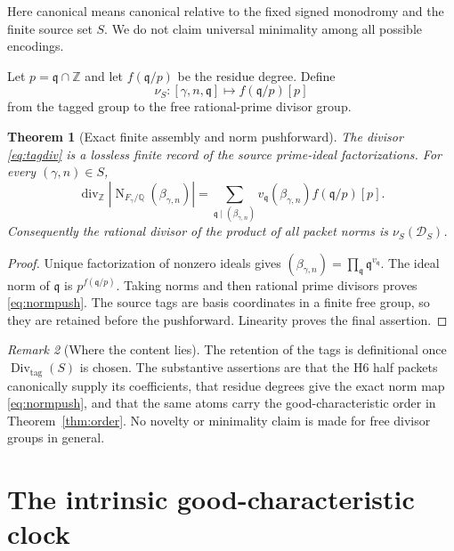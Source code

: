 \documentclass[11pt]{article}
\newtheorem{theorem}{Theorem}[section]
\theoremstyle{definition}\newtheorem{definition}[theorem]{Definition}
\theoremstyle{remark}\newtheorem{remark}[theorem]{Remark}
\DeclareMathOperator{\Div}{Div}
\DeclareMathOperator{\Norm}{N}
\begin{document}
Here canonical means canonical relative to the fixed signed monodromy and
the finite source set $S$.  We do not claim universal minimality among all
possible encodings.

Let $p=\mathfrak q\cap\mathbb Z$ and let
$f(\mathfrak q/p)$ be the residue degree.  Define
\begin{equation}\label{eq:push}
\nu_S:[\gamma,n,\mathfrak q]\longmapsto
f(\mathfrak q/p)[p]
\end{equation}
from the tagged group to the free rational-prime divisor group.

\begin{theorem}[Exact finite assembly and norm pushforward]
\label{thm:assembly}
The divisor \eqref{eq:tagdiv} is a lossless finite record of the source
prime-ideal factorizations.  For every $(\gamma,n)\in S$,
\begin{equation}\label{eq:normpush}
\operatorname{div}_{\mathbb Z}
\left|\Norm_{F_\gamma/\mathbb Q}(\beta_{\gamma,n})\right|
=\sum_{\mathfrak q\mid(\beta_{\gamma,n})}
v_{\mathfrak q}(\beta_{\gamma,n})
f(\mathfrak q/p)[p].
\end{equation}
Consequently the rational divisor of the product of all packet norms is
$\nu_S(\mathscr D_S)$.
\end{theorem}
\begin{proof}
Unique factorization of nonzero ideals gives
$(\beta_{\gamma,n})=\prod_{\mathfrak q}\mathfrak q^{v_{\mathfrak q}}$.
The ideal norm of $\mathfrak q$ is $p^{f(\mathfrak q/p)}$.  Taking norms and
then rational prime divisors proves \eqref{eq:normpush}.  The source tags are
basis coordinates in a finite free group, so they are retained before the
pushforward.  Linearity proves the final assertion.
\end{proof}

\begin{remark}[Where the content lies]
The retention of the tags is definitional once
$\Div_{\mathrm{tag}}(S)$ is chosen.  The substantive assertions are that the
H6 half packets canonically supply its coefficients, that residue degrees
give the exact norm map \eqref{eq:normpush}, and that the same atoms carry
the good-characteristic order in Theorem~\ref{thm:order}.  No novelty or
minimality claim is made for free divisor groups in general.
\end{remark}

\section{The intrinsic good-characteristic clock}
\end{document}
